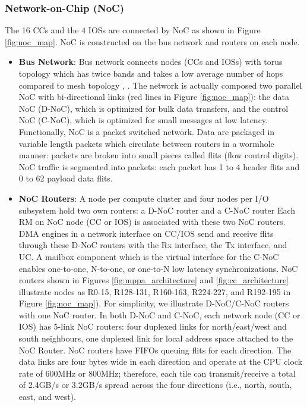 \documentclass{sig-alternate-05-2015}
\begin{document}
\subsubsection{Network-on-Chip (NoC)}
\label{sec:noc}
The 16 CCs and the 4 IOSs are connected by NoC as shown in Figure \ref{fig:noc_map}.
NoC is constructed on the bus network and routers on each node.

\begin{itemize}
\item \textbf{Bus Network}:
Bus network connects nodes (CCs and IOSs) with torus topology \cite{dally2001route}
which has twice bands and takes a low average number of hops compared to mesh topology \cite{vangal200780}, \cite{taylor2002raw}.
The network is actually composed two parallel NoC with bi-directional links (red lines in Figure \ref{fig:noc_map}):
the data NoC (D-NoC), which is optimized for bulk data transfers, and the control NoC (C-NoC), which is optimized for small messages at low latency.
Functionally, NoC is a packet switched network.
Data are packaged in variable length packets which circulate between routers in a wormhole manner:
packets are broken into small pieces called flits (flow control digits).
NoC traffic is segmented into packets: each packet has 1 to 4 header flits and 0 to 62 payload data flits.

\item \textbf{NoC Routers}:
A node per compute cluster and four nodes per I/O subsystem hold two own routers: a D-NoC router and a C-NoC router
Each RM on NoC node (CC or IOS) is associated with these two NoC routers.
DMA engines in a network interface on CC/IOS send and receive flits through these D-NoC routers with the Rx interface, the Tx interface, and UC.
A mailbox component which is the virtual interface for the C-NoC enables one-to-one, N-to-one, or one-to-N low latency synchronizations.
NoC routers shown in Figures \ref{fig:mppa_architecture} and \ref{fig:cc_architecture} illustrate nodes as R0-15, R128-131, R160-163, R224-227, and R192-195 in Figure \ref{fig:noc_map}).
For simplicity, we illustrate D-NoC/C-NoC routers with one NoC router.
In both D-NoC and C-NoC, each network node (CC or IOS) has 5-link NoC routers:
four duplexed links for north/east/west and south neighbours, one duplexed link for local address space attached to the NoC Router.
NoC routers have FIFOs queuing flits for each direction.
The data links are four bytes wide in each direction and operate at the CPU clock rate of 600MHz or 800MHz;
therefore, each tile can transmit/receive a total of 2.4GB/s or 3.2GB/s spread across the four directions (i.e., north, south, east, and west).
\end{itemize}
\end{document}
